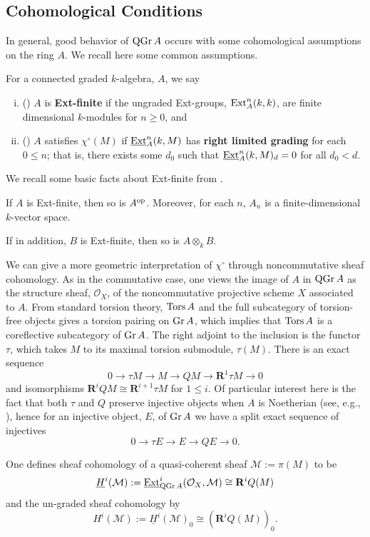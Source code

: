 \documentclass[reqno, 12pt]{amsart}
\begin{document}
\subsection{Cohomological Conditions}
In general, good behavior of $\operatorname{QGr}A$ occurs with some cohomological assumptions on the ring $A$.
We recall here some common assumptions.
\begin{definition}
  For a connected graded $k$-algebra, $A$, we say
  \begin{enumerate}[(i)]
  \item
    (\cite{VdB}) $A$ is \textbf{Ext-finite} if the ungraded Ext-groups, $\operatorname{Ext}^n_A(k,k)$, are finite dimensional $k$-modules for $n \geq 0$, and
  \item
    (\cite{AZ}) $A$ satisfies $\chi^\circ(M)$ if $\underline{\operatorname{Ext}}_A^n(k,M)$ has \textbf{right limited grading} for each $0 \leq n$; that is, there exists some $d_0$ such that $\underline{\operatorname{Ext}}_A^n(k,M)_d = 0$ for all $d_0 < d$.
  \end{enumerate}
\end{definition}

We recall some basic facts about Ext-finite from \cite{VdB}.
\begin{lemma}
  If $A$ is Ext-finite, then so is $A^{\operatorname{op}}$.
  Moreover, for each $n$, $A_n$ is a finite-dimensional $k$-vector space.

  If in addition, $B$ is Ext-finite, then so is $A \otimes_k B$.
\end{lemma}

We can give a more geometric interpretation of $\chi^\circ$ through noncommutative sheaf cohomology.
As in the commutative case, one views the image of $A$ in $\operatorname{QGr}A$ as the structure sheaf, $\mathcal{O}_X$, of the noncommutative projective scheme $X$ associated to $A$.
From standard torsion theory, $\operatorname{Tors}A$ and the full subcategory of torsion-free objects gives a torsion pairing on $\operatorname{Gr}A$, which implies that $\operatorname{Tors}A$ is a coreflective subcategory of $\operatorname{Gr}A$.
The right adjoint to the inclusion is the functor $\tau$, which takes $M$ to its maximal torsion submodule, $\tau(M)$.
There is an exact sequence
$$0 \to \tau M \to M \to Q M \to \mathbf{R}^1\tau M \to 0$$
and isomorphisms $\mathbf{R}^iQ M \cong \mathbf{R}^{i+1}\tau M$ for $1 \leq i$.
Of particular interest here is the fact that both $\tau$ and $Q$ preserve injective objects when \(A\) is Noetherian (see, e.g., \cite{AZ}), hence for an injective object, $E$, of $\operatorname{Gr}A$ we have a split exact sequence of injectives
$$0 \to \tau E \to E \to Q E \to 0.$$
\begin{definition}
  One defines sheaf cohomology of a quasi-coherent sheaf $\mathcal{M} := \pi(M)$ to be
  $$\underline{H}^i(\mathcal{M}) := \underline{\operatorname{Ext}}^i_{\operatorname{QGr}A}(\mathcal{O}_X, \mathcal{M}) \cong \mathbf{R}^iQ (M)$$
  and the un-graded sheaf cohomology by
  $$H^i(\mathcal{M}) := \underline{H}^i(\mathcal{M})_0 \cong (\mathbf{R}^iQ(M))_0.$$
\end{definition}
\end{document}
